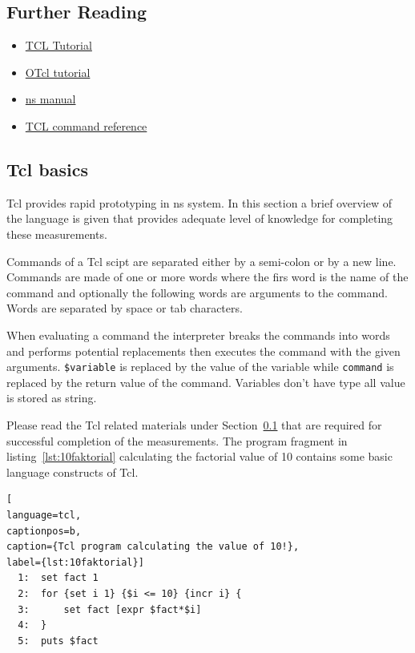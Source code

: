 \documentclass[a4paper]{article}
\begin{document}
\subsection{Further Reading}\label{sec:tcl}
\begin{itemize}
    \item \href{https://www.tcl.tk/man/tcl8.5/tutorial/tcltutorial.html}{TCL Tutorial}
    \item \href{https://www.isi.edu/nsnam/otcl/doc/tutorial.html}{OTcl tutorial}
    \item \href{http://www.isi.edu/nsnam/ns/ns-documentation.html}{ns manual}
    \item \href{http://alpha.tmit.bme.hu/meresek/tcl2.pdf}{TCL command reference}
\end{itemize}

\subsection{Tcl basics}

Tcl provides rapid prototyping in ns system. In this section a brief overview of the language is given that provides
adequate level of knowledge for completing these measurements.

Commands of a Tcl scipt are separated either by a semi-colon or by a new line. Commands are made of one or more words
where the firs word is the name of the command and optionally the following words are arguments to the command. Words
are separated by space or tab characters.

When evaluating a command the interpreter breaks the commands into words and performs potential replacements then
executes the command with the given arguments. \verb!$variable! is replaced by the value of the variable while
\verb!command! is replaced by the return value of the command. Variables don't have type all value is stored as
string.

Please read the Tcl related materials under Section~\ref{sec:tcl} that are required for successful completion of the
measurements. The program fragment in listing~\ref{lst:10faktorial} calculating the factorial value of 10 contains some
basic language constructs of Tcl.

\begin{lstlisting}[
language=tcl,
captionpos=b,
caption={Tcl program calculating the value of 10!},
label={lst:10faktorial}]
  1:  set fact 1
  2:  for {set i 1} {$i <= 10} {incr i} {
  3:      set fact [expr $fact*$i]
  4:  }
  5:  puts $fact
\end{lstlisting}
\end{document}
